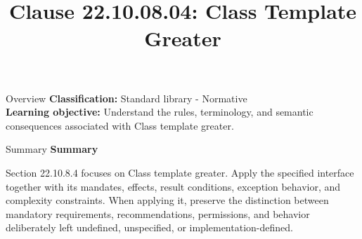 \documentclass[10pt,letterpaper]{article}
\title{Clause 22.10.08.04: Class Template Greater}
\author{}
\date{}
\begin{document}
\maketitle
\begin{CornellOverviewBox}{Overview}
\textbf{Classification:} Standard library - Normative\\[2pt]
\textbf{Learning objective:} Understand the rules, terminology, and semantic consequences associated with Class template greater.
\end{CornellOverviewBox}\begin{CornellSummaryBox}{Summary}
{\sffamily\bfseries\color{Accent} Summary}\par\vspace{3pt}Section 22.10.8.4 focuses on Class template greater. Apply the specified interface together with its mandates, effects, result conditions, exception behavior, and complexity constraints. When applying it, preserve the distinction between mandatory requirements, recommendations, permissions, and behavior deliberately left undefined, unspecified, or implementation-defined.
\end{CornellSummaryBox}
\end{document}

